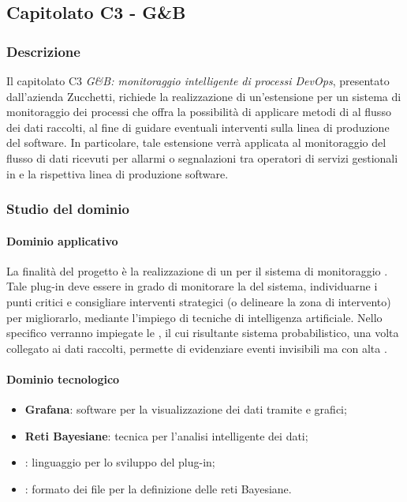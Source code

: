 	\subsection{Capitolato C3 - G\&B}
	
	\subsubsection{Descrizione}
	Il capitolato C3 \emph{G\&B: monitoraggio intelligente di processi DevOps}, presentato dall'azienda Zucchetti, richiede la realizzazione di un'estensione per un sistema di monitoraggio dei processi  che offra la possibilità di applicare metodi di  al flusso dei dati raccolti, al fine di guidare eventuali interventi sulla linea di produzione del software. In particolare, tale estensione verrà applicata al monitoraggio del flusso di dati ricevuti per allarmi o segnalazioni tra operatori di servizi gestionali in  e la rispettiva linea di produzione software.
	
	\subsubsection{Studio del dominio}
	\paragraph{Dominio applicativo} \Spazio 
	La finalità del progetto è la realizzazione di un  per il sistema di monitoraggio . Tale plug-in deve essere in grado di monitorare la  del sistema, individuarne i punti critici e consigliare  interventi strategici (o  delineare la zona di intervento) per migliorarlo, mediante l'impiego di tecniche di intelligenza artificiale. Nello specifico verranno impiegate le , il cui risultante sistema probabilistico, una volta collegato ai dati raccolti, permette di evidenziare eventi invisibili ma con alta .
	\paragraph{Dominio tecnologico}
	\begin{itemize}
		\item\textbf{{Grafana}}: software per la visualizzazione dei dati tramite  e grafici;
		\item\textbf{{Reti Bayesiane}}: tecnica per l'analisi intelligente dei dati;
		\item\textbf{{}}: linguaggio per lo sviluppo del plug-in;
		\item\textbf{{}}: formato dei file per la definizione delle reti Bayesiane.
	\end{itemize}
	
